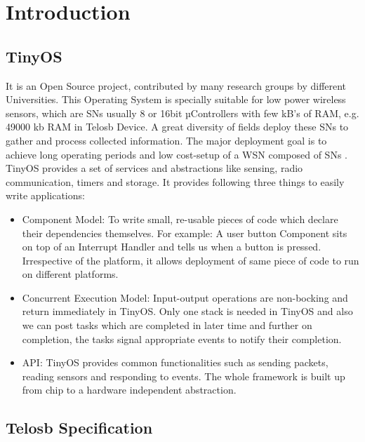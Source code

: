 \chapter{Introduction}\label{ch:introduction}

\section{TinyOS}

It is an Open Source project, contributed by many research groups by different Universities. This Operating System is specially suitable for low power wireless sensors, which are \acp{SN} usually 8 or 16bit µControllers with few kB's of RAM, e.g. 49000 kb RAM in Telosb Device. A great diversity of fields deploy these  \acp{SN} to gather and process collected information. The major deployment goal is to achieve long operating periods and low cost-setup of a \acf{WSN} composed of \acp{SN} . TinyOS provides a set of services and abstractions like sensing, radio communication, timers and storage. It provides following three things to easily write applications: 

\begin{itemize}
	\item Component Model: To write small, re-usable pieces of code which declare their dependencies themselves. For example: A user button Component sits on top of an Interrupt Handler and tells us when a button is pressed. Irrespective of the platform, it allows deployment of same piece of code to run on different platforms.
	
	\item Concurrent Execution Model: Input-output operations are non-bocking and return immediately in TinyOS. Only one stack is needed in TinyOS and also we can post tasks which are completed in later time and further on completion, the tasks signal appropriate events to notify their completion.
	
	\item \ac{API}: TinyOS provides common functionalities such as sending packets, reading sensors and responding to events. The whole framework is built up from chip to a hardware independent abstraction.
\end{itemize}

\section{Telosb Specification}

